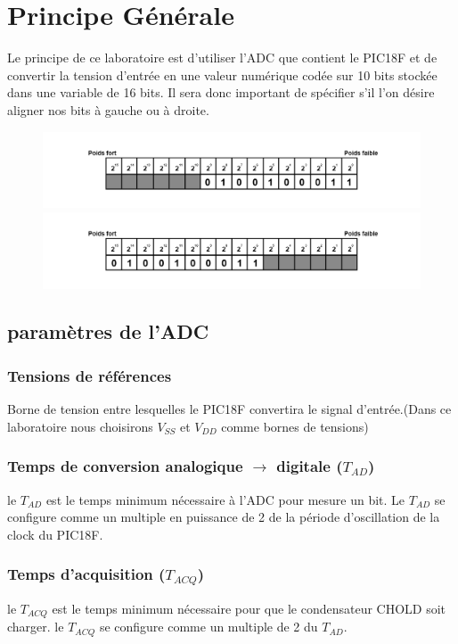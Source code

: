 \section{Principe Générale}
Le principe de ce laboratoire est d'utiliser l'ADC que contient le PIC18F et de convertir la tension d'entrée en une valeur numérique codée sur 10 bits stockée dans une variable de 16 bits. Il sera donc important de spécifier s'il l'on désire aligner nos bits à gauche ou à droite.

\begin{figure}
\begin{center}
\includegraphics[scale=0.8]{images/aligndroite.png}
\includegraphics[scale=0.8]{images/aligngauche.png}
\caption{}
\end{center}
\end{figure}

\subsection{paramètres de l'ADC}

\subsubsection*{Tensions de références}
Borne de tension entre lesquelles le PIC18F convertira le signal d'entrée.(Dans ce laboratoire nous choisirons  $V_{SS}$ et $V_{DD}$ comme bornes de tensions)
\subsubsection*{Temps de conversion analogique $\rightarrow$ digitale  ($T_{AD}$)}
le $T_{AD}$  est le temps minimum nécessaire à l'ADC pour mesure un bit. Le $T_{AD}$ se configure comme un multiple en puissance de 2 de la période d'oscillation de la clock du PIC18F.
\subsubsection*{Temps d'acquisition ($T_{ACQ}$)}
le $T_{ACQ}$ est le temps minimum nécessaire pour que le condensateur CHOLD soit charger. le $T_{ACQ}$  se configure comme un multiple de 2 du $T_{AD}$. 
 